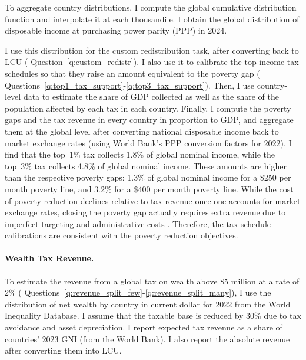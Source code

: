 \documentclass[12pt,english]{article}
\begin{document}
\begin{bibunit}
To aggregate country distributions, I compute the global cumulative distribution function and interpolate it at each thousandile. I obtain the global distribution of disposable income at purchasing power parity (PPP) in 2024. 

I use this distribution for the custom redistribution task, after converting back to LCU (%
Question~\ref{q:custom_redistr}). I also use it to calibrate the top income tax schedules so that they raise an amount equivalent to the poverty gap (%
Questions~\ref{q:top1_tax_support}-\ref{q:top3_tax_support}). %
Then, I use country-level data to estimate the share of GDP collected as well as the share of the population affected by each tax in each country. 
Finally, I compute the poverty gaps and the tax revenue in every country in proportion to GDP, and aggregate them at the global level after converting national disposable income back to market exchange rates (using World Bank's PPP conversion factors for 2022). 
I find that the top~1\% tax collects 1.8\% of global nominal income, while the top~3\% tax collects 4.8\% of global nominal income. These amounts are higher than the respective poverty gaps: 1.3\% of global nominal income for a \$250 per month poverty line, and 3.2\% for a \$400 per month poverty line. 
While the cost of poverty reduction declines relative to tax revenue once one accounts  for market exchange rates, closing the poverty gap actually requires extra revenue due to imperfect targeting and administrative costs \citep{sahoo_what_2025}. Therefore, the tax schedule calibrations are consistent with the poverty reduction objectives.

\paragraph{Wealth Tax Revenue.}

To estimate the revenue from a global tax on wealth above \$5 million at a rate of 2\% (%
Questions~\ref{q:revenue_split_few}-\ref{q:revenue_split_many}), I use the distribution of net wealth by country in current dollar for 2022 from the World Inequality Database. I assume that the taxable base is reduced by 30\% due to tax avoidance and asset depreciation. I report expected tax revenue as a share of countries' 2023 GNI (from the World Bank). I also report the absolute revenue after converting them into LCU. 


\end{bibunit}
\end{document}
